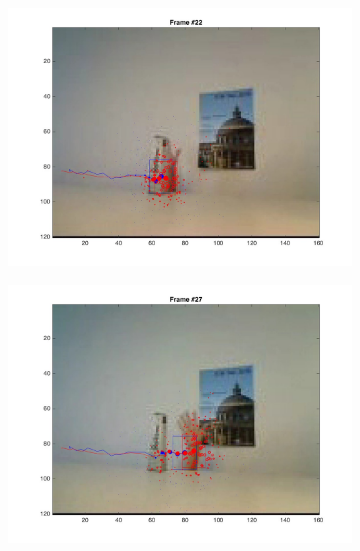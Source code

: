 \documentclass{ethz_report}
\begin{document}
\begin{figure}[h]
\begin{subfigure}[b]{.25\textwidth}
        \includegraphics[width=1\linewidth]{images/video2_observe_high_21}
    \end{subfigure}%
    \begin{subfigure}[b]{.25\textwidth}
        \centering
        \includegraphics[width=1\linewidth]{images/video2_observe_high_26}
    \end{subfigure}%
    \begin{subfigure}[b]{.25\textwidth}
        \centering

\end{subfigure}
\end{figure}
\end{document}
